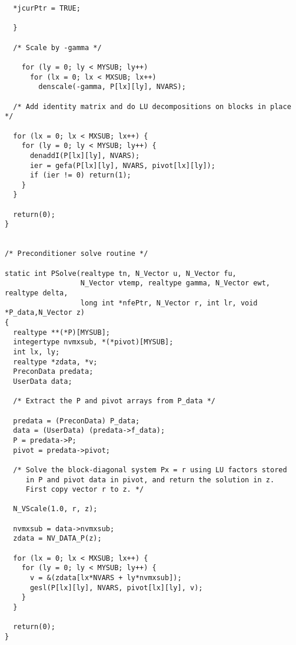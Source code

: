 \begin{verbatim}
  *jcurPtr = TRUE;

  }

  /* Scale by -gamma */

    for (ly = 0; ly < MYSUB; ly++)
      for (lx = 0; lx < MXSUB; lx++)
        denscale(-gamma, P[lx][ly], NVARS);

  /* Add identity matrix and do LU decompositions on blocks in place */

  for (lx = 0; lx < MXSUB; lx++) {
    for (ly = 0; ly < MYSUB; ly++) {
      denaddI(P[lx][ly], NVARS);
      ier = gefa(P[lx][ly], NVARS, pivot[lx][ly]);
      if (ier != 0) return(1);
    }
  }

  return(0);
}


/* Preconditioner solve routine */

static int PSolve(realtype tn, N_Vector u, N_Vector fu,
                  N_Vector vtemp, realtype gamma, N_Vector ewt, realtype delta,
                  long int *nfePtr, N_Vector r, int lr, void *P_data,N_Vector z)
{
  realtype **(*P)[MYSUB];
  integertype nvmxsub, *(*pivot)[MYSUB];
  int lx, ly;
  realtype *zdata, *v;
  PreconData predata;
  UserData data;

  /* Extract the P and pivot arrays from P_data */

  predata = (PreconData) P_data;
  data = (UserData) (predata->f_data);
  P = predata->P;
  pivot = predata->pivot;

  /* Solve the block-diagonal system Px = r using LU factors stored
     in P and pivot data in pivot, and return the solution in z.
     First copy vector r to z. */

  N_VScale(1.0, r, z);

  nvmxsub = data->nvmxsub;
  zdata = NV_DATA_P(z);

  for (lx = 0; lx < MXSUB; lx++) {
    for (ly = 0; ly < MYSUB; ly++) {
      v = &(zdata[lx*NVARS + ly*nvmxsub]);
      gesl(P[lx][ly], NVARS, pivot[lx][ly], v);
    }
  }

  return(0);
}
\end{verbatim}